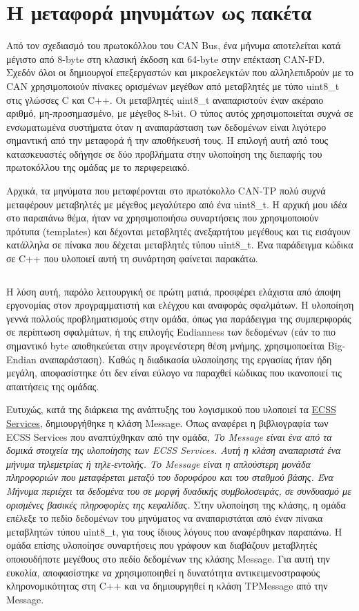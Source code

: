 \documentclass[a4paper,nobib,justified]{tufte-book}
\begin{document}
\newpage
\section{Η μεταφορά μηνυμάτων ως πακέτα}

Από τον σχεδιασμό του πρωτοκόλλου του CAN Bus, ένα μήνυμα αποτελείται κατά μέγιστο από 8-byte στη κλασική έκδοση και 64-byte στην επέκταση CAN-FD. Σχεδόν όλοι οι δημιουργοί επεξεργαστών και μικροελεγκτών που αλληλεπιδρούν με το CAN χρησιμοποιούν πίνακες ορισμένων μεγέθων από μεταβλητές με τύπο uint8\_t στις γλώσσες C και C++. Οι μεταβλητές uint8\_t αναπαριστούν έναν ακέραιο αριθμό, μη-προσημασμένο, με μέγεθος 8-bit. Ο τύπος αυτός χρησιμοποιείται συχνά σε ενσωματωμένα συστήματα όταν η αναπαράσταση των δεδομένων είναι λιγότερο σημαντική από την μεταφορά ή την αποθήκευσή τους. Η επιλογή αυτή από τους κατασκευαστές οδήγησε σε δύο προβλήματα στην υλοποίηση της διεπαφής του πρωτοκόλλου της ομάδας με το περιφερειακό.

Αρχικά, τα μηνύματα που μεταφέρονται στο πρωτόκολλο CAN-TP πολύ συχνά μεταφέρουν μεταβηλτές με μέγεθος μεγαλύτερο από ένα uint8\_t. Η αρχική μου ιδέα στο παραπάνω θέμα, ήταν να χρησιμοποιήσω συναρτήσεις που χρησιμοποιούν πρότυπα (templates) και δέχονται μεταβλητές ανεξαρτήτου μεγέθους και τις εισάγουν κατάλληλα σε πίνακα που δέχεται μεταβλητές τύπου uint8\_t. Ένα παράδειγμα κώδικα σε C++ που υλοποιεί αυτή τη συνάρτηση φαίνεται παρακάτω. 

\inputminted{cpp}{code/examples/stuffInVector.cpp}

Η λύση αυτή, παρόλο λειτουργική σε πρώτη ματιά, προσφέρει ελάχιστα από άποψη εργονομίας στον προγραμματιστή και ελέγχου και αναφοράς σφαλμάτων. Η υλοποίηση γεννά πολλούς προβληματισμούς στην ομάδα, όπως για παράδειγμα της συμπεριφοράς σε περίπτωση σφαλμάτων, ή της επιλογής Endianness των δεδομένων (εάν το πιο σημαντικό byte αποθηκεύεται στην προγενέστερη θέση μνήμης, χρησιμοποείται Big-Endian αναπαράσταση). Καθώς η διαδικασία υλοποίησης της εργασίας ήταν ήδη μεγάλη, αποφασίστηκε ότι δεν είναι εύλογο να παραχθεί κώδικας που ικανοποιεί τις απαιτήσεις της ομάδας.

Ευτυχώς, κατά της διάρκεια της ανάπτυξης του λογισμικού που υλοποιεί τα \href{https://gitlab.com/acubesat/obc/ecss-services}{ECSS Services}, δημιουργήθηκε η κλάση Message. Όπως αναφέρει η βιβλιογραφία των ECSS Services που αναπτύχθηκαν από την ομάδα, \textit{Το Message είναι ένα από τα δομικά στοιχεία της υλοποίησης των ECSS Services. Αυτή η κλάση αναπαριστά ένα μήνυμα τηλεμετρίας ή τηλε-εντολής. Το Message είναι η απλούστερη μονάδα πληροφοριών που μεταφέρεται μεταξύ του δορυφόρου και του σταθμού βάσης. Ένα Μήνυμα περιέχει τα δεδομένα του σε μορφή δυαδικής συμβολοσειράς, σε συνδυασμό με ορισμένες βασικές πληροφορίες της κεφαλίδας.} Στην υλοποίηση της κλάσης, η ομάδα επέλεξε το πεδίο δεδομένων του μηνύματος να αναπαριστάται από έναν πίνακα μεταβλητών τύπου uint8\_t, για τους ίδιους λόγους που αναφέρθηκαν παραπάνω. Η ομάδα επίσης υλοποίησε συναρτήσεις που γράφουν και διαβάζουν μεταβλητές οποιουδήποτε μεγέθους στο πεδίο δεδομένων της κλάσης Message. Για αυτή την ευκολία, αποφασίστηκε να χρησιμοποιηθεί η δυνατότητα αντικειμενοστραφούς κληρονομικότητας στη C++ και να δημιουργηθεί η κλάση TPMessage από την Message.
\end{document}
